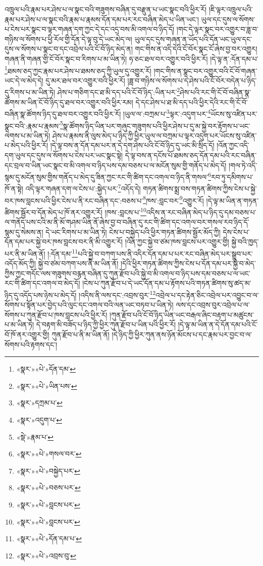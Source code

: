 འཁྲུལ་པའི་རྣམ་པར་ཤེས་པ་ལ་སྣང་བའི་གཟུགས་བཞིན་དུ་བརྫུན་པ་ཡང་སྣང་བའི་ཕྱིར་རོ། །ཇི་ལྟར་འཁྲུལ་པའི་རྣམ་པར་ཤེས་པ་ལ་སྣང་བའི་རྣམ་པ་རྣམས་དོན་དམ་པར་རང་བཞིན་མེད་པ་ཡིན་ཡང་། ཡུལ་དང་དུས་ལ་སོགས་པ་ངེས་པར་སྣང་བ་ལྟར་གཞན་དག་ཀྱང་དེ་དང་འདྲ་བས་མི་འགལ་བ་ཉིད་དོ། །གང་དེ་ལྟར་སྣང་བར་འགྱུར་བ་ཟླ་བ་གཉིས་ལ་སོགས་པ་ཕྱི་རོལ་གྱི་དོན་དེ་ལྟ་བུ་དེ་ཡང་མེད་ལ། ཡུལ་དང་དུས་གཞན་ན་ཡོད་པའི་དོན་ཡང་ཡུལ་དང་དུས་ལ་སོགས་པ་སྣང་བ་དང་འབྲེལ་པའི་ངོ་བོ་ཉིད་མེད་ན། གང་གིས་ན་འདི་དེའི་ངོ་བོར་སྣང་ངོ་ཞེས་བྱ་བར་འགྱུར། གཞན་ནི་གཞན་གྱི་ངོ་བོར་སྣང་བ་རིགས་པ་མ་ཡིན་ཏེ། ཧ་ཅང་ཐལ་བར་འགྱུར་བའི་ཕྱིར་རོ། །དེ་ལྟ་ན་:དོན་དམ་པ་\footnote{«སྣར་»«པེ་»དོན་དམ་}ཐམས་ཅད་ཀྱང་རྣམ་པར་ཤེས་པ་ཐམས་ཅད་ཀྱི་ཡུལ་དུ་འགྱུར་རོ། །གང་གིས་ན་སྣང་བར་འགྱུར་བའི་ངོ་བོ་གཞན་ཡང་དེ་ལ་མེད་དེ། དུ་མར་ཐལ་བར་འགྱུར་བའི་ཕྱིར་རོ། །ཟླ་བ་གཉིས་ལ་སོགས་པ་དེ་ཤེས་པའི་ངོ་བོར་བདེན་པ་ཉིད་དུ་རིགས་པ་མ་ཡིན་ཏེ། ཤེས་པ་གཅིག་དང་ཐ་མི་དད་པའི་ངོ་བོ་ཉིད་:ཡིན་པར་\footnote{«སྣར་»«པེ་»ཡིན་པས་}ཤེས་པའི་རང་གི་ངོ་བོ་བཞིན་སྣ་ཚོགས་མ་ཡིན་ངོ་བོ་ཉིད་དུ་ཐལ་བར་འགྱུར་བའི་ཕྱིར་རམ། དེ་དང་ཤེས་པ་ཐ་མི་དད་པའི་ཕྱིར་དེའི་རང་གི་ངོ་བོ་བཞིན་སྣ་ཚོགས་ཉིད་དུ་ཐལ་བར་འགྱུར་བའི་ཕྱིར་རོ། །ཡུལ་ལ་:བཀྲམ་པ་\footnote{«སྣར་»དཀྲམ་པ་}ལྟར་:འདུག་པར་\footnote{«སྣར་»འདུག་པ་}ཡོངས་སུ་འཛིན་པར་སྣང་བའི་:རྣམ་པ་རྣམས་\footnote{«སྡེ་»རྣམ་པ་}སྣ་ཚོགས་ཉིད་ཡིན་པར་གཞུང་གཟུགས་པའི་ཕྱིར་ཤེས་པ་དུ་མ་སྐྱེ་བར་རྟོགས་པ་ཡང་ལེགས་པ་མ་ཡིན་ཏེ། ཤེས་པ་རྣམས་ནི་ལུས་མེད་པ་ཉིད་ཀྱི་ཕྱིར་ཡུལ་ལ་བཀྲམ་པ་ལྟར་འདུག་པར་ཡོངས་སུ་འཛིན་པ་མེད་པའི་ཕྱིར་རོ། །དེ་ལྟ་བས་ན་དོན་དམ་པར་ན་དེ་དག་ཤེས་པའི་ངོ་བོ་ཉིད་དུ་ཡང་མི་སྲིད་དོ། །འོན་ཀྱང་འདི་དག་ཡུལ་དང་དུས་ལ་སོགས་པ་ངེས་པར་ཡང་སྣང་སྟེ། དེ་ལྟ་བས་ན་དངོས་པོ་ཐམས་ཅད་དོན་དམ་པའི་རང་བཞིན་དང་བྲལ་བ་ཡིན་ཡང་སྣང་བ་མི་འགལ་བ་ཉིད་པས་དམ་བཅས་པ་ལ་མངོན་སུམ་གྱི་གནོད་པ་མེད་དོ། །གལ་ཏེ་འདི་སྙམ་དུ་མངོན་སུམ་གྱིས་གནོད་པ་མེད་དུ་ཟིན་ཀྱང་རང་གི་ཚིག་དང་འགལ་བ་ཉིད་ནི་གསལ་\footnote{«སྣར་»«པེ་»གསལ་བར་}རབ་ཏུ་དམིགས་པ་ཁོ་ན་སྟེ། འདི་ལྟར་གཞན་དག་ལ་ངེས་པ་:སྐྱེད་པར་\footnote{«སྣར་»«པེ་»བསྐྱེད་པར་}འདོད་དེ། གཏན་ཚིགས་སྨྲ་བས་གཏན་ཚིགས་ཀྱིས་ངེས་པ་སྐྱེ་བར་ཁས་བླངས་པའི་ཕྱིར་ངེས་པ་ནི་རང་བཞིན་དང་:བཅས་པ་\footnote{«སྣར་»«པེ་»བཅས་པར་}ཁས་:བླང་བར་\footnote{«སྣར་»«པེ་»བླངས་པར་}འགྱུར་རོ། །དེ་ལྟ་མ་ཡིན་ན་གཏན་ཚིགས་སྦྱོར་བ་དོན་མེད་པ་ཁོ་ནར་འགྱུར་རོ། །ཁས་:བླངས་པ་\footnote{«སྣར་»«པེ་»བླངས་པར་}འདིས་ན་རང་བཞིན་མེད་པ་ཉིད་དུ་དམ་བཅས་པ་ལ་གནོད་པས་ངའི་མ་ནི་མོ་གཤམ་ཡིན་ནོ་ཞེས་བྱ་བ་བཞིན་དུ་རང་གི་ཚིག་དང་འགལ་བར་གསལ་རབ་ཉིད་དོ་སྙམ་དུ་སེམས་ན། དེ་ཡང་རིགས་པ་མ་ཡིན་ཏེ། ངེས་པ་བསྐྱེད་པའི་ཕྱིར་གཏན་ཚིགས་སྦྱོར་མོད་ཀྱི། དེས་ངེས་པ་དོན་དམ་པར་སྐྱེ་བར་ཁས་བླངས་བར་ནི་མི་འགྱུར་རོ། །འོན་ཀྱང་སྐྱེ་བ་ཙམ་ཁས་བླངས་པར་འགྱུར་གྱི། སྐྱེ་བའི་ཁྱད་པར་ནི་མ་ཡིན་ནོ། །:དོན་དམ་\footnote{«སྣར་»«པེ་»དོན་དམ་པ་}པའི་སྐྱེ་བ་བཀག་པས་ནི་འདིར་དོན་དམ་པ་པར་རང་བཞིན་མེད་པར་སྒྲུབ་པར་འདོད་མོད་ཀྱི། སྐྱེ་བ་ཙམ་བཀག་པས་ནི་མ་ཡིན་ནོ། །དེའི་ཕྱིར་གཏན་ཚིགས་ཀྱིས་ངེས་པ་དོན་དམ་པར་སྐྱེ་བ་མེད་ཀྱིས་ཀྱང་གདོང་ལས་གཟུགས་བརྙན་བཞིན་དུ་ཀུན་རྫོབ་པའི་སྐྱེ་བ་མི་འགལ་བ་ཉིད་པས་དམ་བཅས་པ་ལ་ཡང་རང་གི་ཚིག་དང་འགལ་བ་མེད་དོ། །ངེས་པ་ཀུན་རྫོབ་པ་དེ་ཡང་དོན་དམ་པ་རྟོགས་པའི་གཏན་ཚིགས་སུ་ཚད་མ་ཉིད་དུ་འདོད་པས་ཉེས་པ་མེད་དོ། །འདིས་ནི་ལས་དང་:འབྲས་བུར་\footnote{«སྣར་»«པེ་»འབྲས་བུ་}འབྲེལ་པ་དང་རྟེན་ཅིང་འབྲེལ་པར་འབྱུང་བ་ལ་སོགས་པ་སྟོན་པར་བྱེད་པའི་ལུང་དང་འགལ་བའི་ལན་ཡང་བཏབ་པ་ཡིན་ཏེ། ལས་དང་འབྲས་བུར་འབྲེལ་པ་ལ་སོགས་པ་ཀུན་རྫོབ་པ་ཁས་བླངས་པའི་ཕྱིར་རོ། །ཀུན་རྫོབ་པའི་ངོ་བོ་ཉིད་ཡིན་ཡང་བརྒལ་ཞིང་བརྟག་པ་མཚུངས་པ་མ་ཡིན་ཏེ། དེ་བརྟག་མི་བཟོད་པ་ཉིད་ཀྱི་ཕྱིར་ཀུན་རྫོབ་པ་ཡིན་པའི་ཕྱིར་རོ། །དེ་ལྟ་མ་ཡིན་ན་དེ་དོན་དམ་པའི་ངོ་བོ་ཁོ་ནར་འགྱུར་གྱི། ཀུན་རྫོབ་པ་ནི་མ་ཡིན་ནོ། །དེ་ཉིད་ཀྱི་ཕྱིར་ཀུན་ནས་ཉོན་མོངས་པ་དང་རྣམ་པར་བྱང་བ་ལ་སོགས་པའི་རྟགས་དང་། 